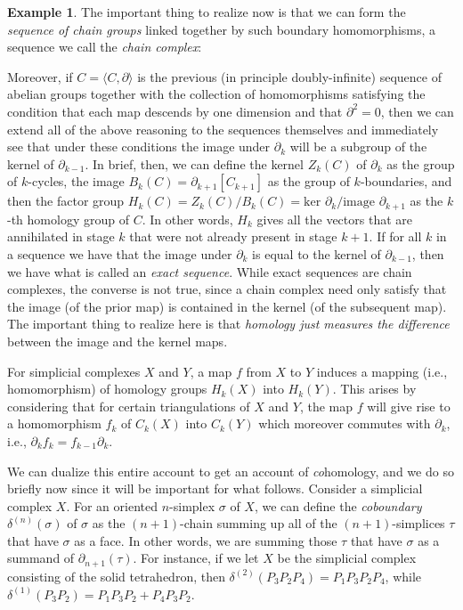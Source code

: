 \documentclass[11pt]{book}
\theoremstyle{definition}
\newtheorem{example}{Example}[section]
\theoremstyle{definition}
\theoremstyle{definition}
\theoremstyle{theorem}
\theoremstyle{definition}
\begin{document}
\begin{example}
	The important thing to realize now is that we can form the \textit{sequence of chain groups} linked together by such boundary homomorphisms, a sequence we call the \textit{chain complex}: \par 
	\begin{center} 
	\end{center} 
	\par 
	Moreover, if $C = \langle C, \partial \rangle$ is the previous (in principle doubly-infinite) sequence of abelian groups together with the collection of homomorphisms satisfying the condition that each map descends by one dimension and that $\partial^2 = 0$, then we can extend all of the above reasoning to the sequences themselves and immediately see that under these conditions the image under $\partial_k$ will be a subgroup of the kernel of $\partial_{k-1}$. In brief, then, we can define the kernel $Z_k(C)$ of $\partial_k$ as the group of $k$-cycles, the image $B_k(C) = \partial_{k+1}[C_{k+1}]$ as the group of $k$-boundaries, and then the factor group $H_k(C) = Z_k(C)/B_k(C) = \text{ker } \partial_k / \text{image } \partial_{k+1}$ as the $k$-th homology group of $C$. In other words, $H_k$ gives all the vectors that are annihilated in stage $k$ that were not already present in stage $k+1$. If for all $k$ in a sequence we have that the image under $\partial_k$ is equal to the kernel of $\partial_{k-1}$, then we have what is called an \textit{exact sequence}. While exact sequences are chain complexes, the converse is not true, since a chain complex need only satisfy that the image (of the prior map) is contained in the kernel (of the subsequent map). The important thing to realize here is that \textit{homology just measures the difference} between the image and the kernel maps. \par 
	For simplicial complexes $X$ and $Y$, a map $f$ from $X$ to $Y$ induces a mapping (i.e., homomorphism) of homology groups $H_k(X)$ into $H_k(Y)$. This arises by considering that for certain triangulations of $X$ and $Y$, the map $f$ will give rise to a homomorphism $f_k$ of $C_k(X)$ into $C_k(Y)$ which moreover commutes with $\partial_k$, i.e., $\partial_k f_k = f_{k-1}\partial_k$. \par  
	We can dualize this entire account to get an account of \textit{co}homology, and we do so briefly now since it will be important for what follows. Consider a simplicial complex $X$. For an oriented $n$-simplex $\sigma$ of $X$, we can define the \textit{coboundary} $\delta^{(n)}(\sigma)$ of $\sigma$ as the $(n+1)$-chain summing up all of the $(n+1)$-simplices $\tau$ that have $\sigma$ as a face. In other words, we are summing those $\tau$ that have $\sigma$ as a summand of $\partial_{n+1}(\tau)$. For instance, if we let $X$ be the simplicial complex consisting of the solid tetrahedron, then $\delta^{(2)}(P_3P_2P_4) = P_1P_3P_2P_4$, while $\delta^{(1)}(P_3P_2) = P_1P_3P_2 + P_4P_3P_2$.\par 

\end{example}
\end{document}
